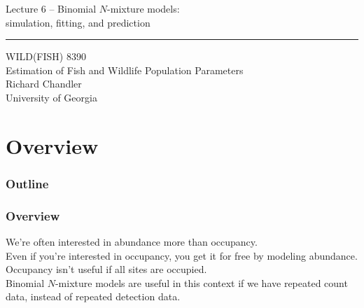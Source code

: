 \documentclass[color=usenames,dvipsnames]{beamer}\usepackage[]{graphicx}\usepackage[]{color}
\begin{document}
\begin{frame}[plain]
  \LARGE
  \centering
  {\LARGE Lecture 6 -- Binomial $N$-mixture models: \\ simulation, fitting, and prediction} \\
  {\color{default} \rule{\textwidth}{0.1pt}}
  \vfill
  \large
  WILD(FISH) 8390 \\
  Estimation of Fish and Wildlife Population Parameters \\
  \vfill
  \large
  Richard Chandler \\
  University of Georgia \\
\end{frame}






\section{Overview}



\begin{frame}[plain]
  \frametitle{Outline}
  \Large
\end{frame}



\begin{frame}
  \frametitle{Overview}
  We're often interested in abundance more than occupancy. \\
  \pause
  \vfill
  Even if you're interested in occupancy, you get it for free by modeling abundance. \\
  \pause
  \vfill
  Occupancy isn't useful if all sites are occupied. \\
  \pause
  \vfill
  Binomial $N$-mixture models are useful in this context if we have
  repeated count data, instead of repeated detection data. 
\end{frame}
\end{document}
